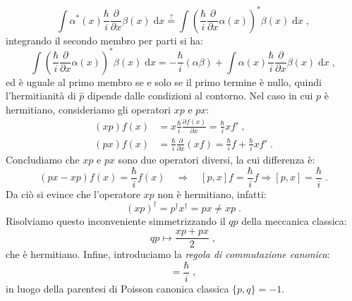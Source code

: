 \documentclass[10pt,a4paper]{report}
\theoremstyle{definition}
\newcommand{\pdev}[3][]{\frac{\partial^{#1} #2}{\partial #3^{#1}}}
\numberwithin{equation}{section}
\newcommand{\diff}[1][]{\mathrm{d}#1}
\begin{document}
$$
\int \alpha^*(x)\frac{\hbar}{i}\frac{\partial}{\partial x}\beta(x)\;\diff{x}\stackrel{?}{=}\int \left(\frac{\hbar}{i}\frac{\partial}{\partial x}\alpha(x)\right)^*\beta(x)\;\diff{x}\;,
$$
integrando il secondo membro per parti si ha:
$$
\int \left(\frac{\hbar}{i}\frac{\partial}{\partial x}\alpha(x)\right)^*\beta(x)\;\diff{x} =-\frac{\hbar}{i}(\alpha\beta)+\int \alpha(x)\frac{\hbar}{i}\frac{\partial}{\partial x}\beta(x)\;\diff{x}\;,
$$
ed è uguale al primo membro se e solo se il primo termine è nullo, quindi l'hermitianità di $\hat{p}$ dipende dalle condizioni al contorno. Nel caso in cui $p$ è hermitiano, consideriamo gli operatori $xp$ e $px$:
\begin{align*}
(xp)f(x)&=x\frac{\hbar}{i}\pdev{f(x)}{x}=\frac{\hbar}{i}xf'\;, \\
(px)f(x)&= \frac{\hbar}{i}\frac{\partial}{\partial x}(xf)=\frac{\hbar}{i}f+\frac{\hbar}{i}xf'\;.
\end{align*}
Concludiamo che $xp$ e $px$ sono due operatori diversi, la cui differenza è:
\begin{equation}
(px-xp)f(x)=\frac{\hbar}{i}f(x)\quad \Longrightarrow \quad [p,x]f=\frac{\hbar}{i}f \Longrightarrow [p,x]=\frac{\hbar}{i}\;.
\end{equation}
Da ciò si evince che l'operatore $xp$ non è hermitiano, infatti:
$$
(xp)^{\dagger}=p^{\dagger}x^{\dagger}=px\ne xp\;.
$$
Risolviamo questo inconveniente simmetrizzando il $qp$ della meccanica classica:
$$
qp \longmapsto \frac{xp+px}{2}\;,
$$
che è hermitiano. Infine, introduciamo la \textit{regola di commutazione canonica}:
\begin{equation}
[p,x]=\frac{\hbar}{i}\;,
\end{equation}
in luogo della parentesi di Poisson canonica classica $\{p,q\}=-1$.
\end{document}
